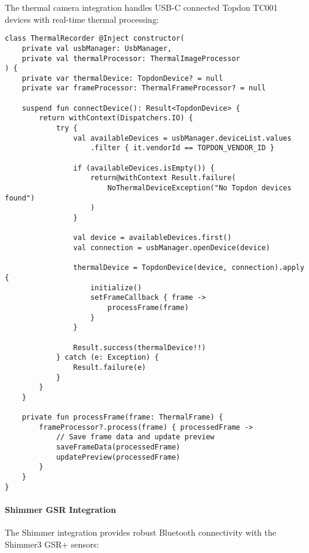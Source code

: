 \documentclass[11pt,a4paper]{report}
\begin{document}
The thermal camera integration handles USB-C connected Topdon TC001 devices with real-time thermal processing:

\begin{verbatim}
class ThermalRecorder @Inject constructor(
    private val usbManager: UsbManager,
    private val thermalProcessor: ThermalImageProcessor
) {
    private var thermalDevice: TopdonDevice? = null
    private var frameProcessor: ThermalFrameProcessor? = null

    suspend fun connectDevice(): Result<TopdonDevice> {
        return withContext(Dispatchers.IO) {
            try {
                val availableDevices = usbManager.deviceList.values
                    .filter { it.vendorId == TOPDON_VENDOR_ID }

                if (availableDevices.isEmpty()) {
                    return@withContext Result.failure(
                        NoThermalDeviceException("No Topdon devices found")
                    )
                }

                val device = availableDevices.first()
                val connection = usbManager.openDevice(device)

                thermalDevice = TopdonDevice(device, connection).apply {
                    initialize()
                    setFrameCallback { frame ->
                        processFrame(frame)
                    }
                }

                Result.success(thermalDevice!!)
            } catch (e: Exception) {
                Result.failure(e)
            }
        }
    }

    private fun processFrame(frame: ThermalFrame) {
        frameProcessor?.process(frame) { processedFrame ->
            // Save frame data and update preview
            saveFrameData(processedFrame)
            updatePreview(processedFrame)
        }
    }
}
\end{verbatim}

\paragraph{Shimmer GSR Integration}

The Shimmer integration provides robust Bluetooth connectivity with the Shimmer3 GSR+ sensors:
\end{document}
